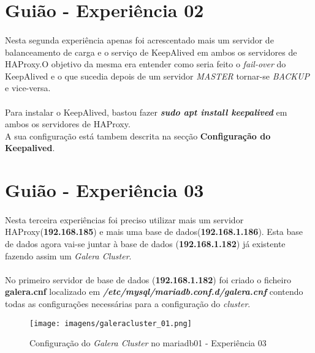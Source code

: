 \documentclass{report}
\begin{document}
\section{Guião - Experiência 02}
\paragraph{}
Nesta segunda experiência apenas foi acrescentado mais um servidor de balanceamento de carga e o serviço de KeepAlived em ambos os servidores de HAProxy.O objetivo da mesma era entender como seria feito o \emph{fail-over} do KeepAlived e o que sucedia depois de um servidor \emph{MASTER} tornar-se \emph{BACKUP} e vice-versa.
\paragraph{}

Para instalar o KeepAlived, bastou fazer \textbf{\emph{sudo apt install keepalived}} em ambos os servidores de HAProxy.\\
A sua configuração está tambem descrita na secção \textbf{Configuração do Keepalived}.


\section{Guião - Experiência 03}
\paragraph{}
Nesta terceira experiências foi preciso utilizar mais um servidor HAProxy(\textbf{192.168.185}) e mais uma base de dados(\textbf{192.168.1.186}). Esta base de dados agora vai-se juntar à base de dados (\textbf{192.168.1.182}) já existente fazendo assim um \emph{Galera Cluster}.

\paragraph{}
No primeiro servidor de base de dados (\textbf{192.168.1.182}) foi criado o ficheiro \textbf{galera.cnf} localizado em \textbf{\emph{/etc/mysql/mariadb.conf.d/galera.cnf}} contendo todas as configurações necessárias para a configuração do \emph{cluster}.


\begin{figure}[H]
\center
\texttt{[image: imagens/galeracluster\_01.png]}
\caption{Configuração do \emph{Galera Cluster} no mariadb01 - Experiência 03}
\label{fig.nav}
\end{figure}
\end{document}
